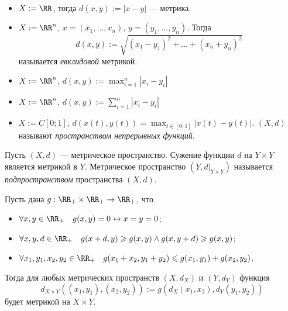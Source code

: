 \documentclass[12pt,a4paper]{article}
\begin{document}
    \begin{example}\ 
        \begin{itemize}
            \item $X := \RR$, тогда $d(x, y) := |x-y|$ --- метрика.
            \item $X := \RR^n$, $x = (x_1, \dots, x_n)$, $y = (y_1, \dots, y_n)$. Тогда
                \[d(x, y) := \sqrt{(x_1 - y_1)^2 + \dots + (x_n + y_n)^2}\]
                называется \emph{евклидовой} метрикой.
            \item $X := \RR^n$, $d(x, y) := \max_{i = 1}^n |x_i - y_i|$
            \item $X := \RR^n$, $d(x, y) := \sum_{i = 1}^n |x_i - y_i|$
            \item $X := C[0; 1]$, $d(x(t), y(t)) = \max_{t \in [0; 1]} |x(t) - y(t)|$. $(X, d)$ называют \emph{пространством непрерывных функций}.
        \end{itemize}
    \end{example}

    \begin{definition}
        Пусть $(X, d)$ --- метрическое пространство. Сужение функции $d$ на $Y \times Y$ является метрикой в $Y$. Метрическое пространство $(Y, d|_{Y\times Y})$ называется \emph{подпространством} пространства $(X, d)$.
    \end{definition}

    \begin{theorem}\label{generalised_metric_spaces_multiplication_theorem}
        Пусть дана $g: \RR_+ \times \RR_+ \to \RR_+$, что
        \begin{itemize}
            \item $\forall x, y \in \RR_+\quad g(x, y) = 0 \leftrightarrow x = y = 0$;
            \item $\forall x, y, d \in \RR_+\quad g(x + d, y) \geqslant g(x, y) \wedge g(x, y + d) \geqslant g(x, y)$;
            \item $\forall x_1, y_1, x_2, y_2 \in \RR_+ \quad g(x_1 + x_2, y_1 + y_2) \leqslant g(x_1, y_1) + g(x_2, y_2)$.
        \end{itemize}
        Тогда для любых метрических пространств $(X, d_X)$ и $(Y, d_Y)$ функция
        \[d_{X \times Y}((x_1, y_1), (x_2, y_2)) := g(d_X(x_1, x_2), d_Y(y_1, y_2))\]
        будет метрикой на $X \times Y$.
    \end{theorem}
\end{document}
